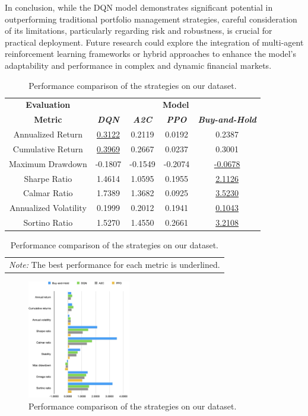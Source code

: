 \documentclass[conference]{IEEEtran}
\begin{document}
In conclusion, while the DQN model demonstrates significant potential in outperforming traditional portfolio management strategies, careful consideration of its limitations, particularly regarding risk and robustness, is crucial for practical deployment. Future research could explore the integration of multi-agent reinforcement learning frameworks or hybrid approaches to enhance the model's adaptability and performance in complex and dynamic financial markets.



\begin{table}[htbp]
  \centering
  \caption{Performance comparison of the strategies on our dataset.}
  \begin{tabular}{|c|c|c|c|c|}
    \hline
    \textbf{Evaluation} & \multicolumn{4}{|c|}{\textbf{Model}} \\
    \cline{2-5}
    \textbf{Metric} & \textit{\textbf{DQN}} & \textit{\textbf{A2C}} & \textit{\textbf{PPO}} & \textit{\textbf{Buy-and-Hold}} \\
    \hline
    Annualized Return & \underline{0.3122} & 0.2119 & 0.0192 & 0.2387 \\
    \hline
    Cumulative Return & \underline{0.3969} & 0.2667 & 0.0237 & 0.3001 \\
    \hline
    Maximum Drawdown & -0.1807 & -0.1549 & -0.2074 & \underline{-0.0678} \\
    \hline
    Sharpe Ratio & 1.4614 & 1.0595 & 0.1955 & \underline{2.1126} \\
    \hline
    Calmar Ratio & 1.7389 & 1.3682 & 0.0925 & \underline{3.5230} \\
    \hline
    Annualized Volatility & 0.1999 & 0.2012 & 0.1941 & \underline{0.1043} \\
    \hline
    Sortino Ratio & 1.5270 & 1.4550 & 0.2661 & \underline{3.2108} \\
    \hline
  \end{tabular}
  \begin{tabular}{p{}}
    \textit{Note:} The best performance for each metric is underlined.
  \end{tabular}
  \label{tab:results}
\end{table}

\begin{figure}[htbp]
  \centerline{\includegraphics[width=0.4\textwidth]{figs/results.png}}
  \caption{Performance comparison of the strategies on our dataset.}
  \label{fig:returns}
\end{figure}
\end{document}

